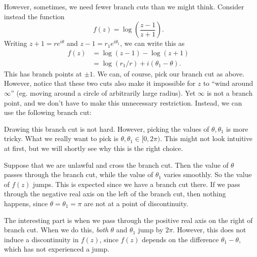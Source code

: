\documentclass[a4paper]{article}
\begin{document}
However, sometimes, we need fewer branch cuts than we might think. Consider instead the function
\[
  f(z) = \log\left(\frac{z - 1}{z + 1}\right).
\]
Writing $z + 1 = r e^{i\theta}$ and $z - 1 = r_1 e^{i \theta_1}$, we can write this as
\begin{align*}
  f(z) &= \log (z - 1) - \log(z + 1)\\
  &= \log(r_1/r) + i(\theta_1 - \theta).
\end{align*}
This has branch points at $\pm 1$. We can, of course, pick our branch cut as above. However, notice that these two cuts also make it impossible for $z$ to ``wind around $\infty$'' (eg. moving around a circle of arbitrarily large radius). Yet $\infty$ is not a branch point, and we don't have to make this unnecessary restriction. Instead, we can use the following branch cut:
\begin{center}
\end{center}
Drawing this branch cut is not hard. However, picking the values of $\theta, \theta_1$ is more tricky. What we really want to pick is $\theta, \theta_1 \in [0, 2\pi)$. This might not look intuitive at first, but we will shortly see why this is the right choice.

Suppose that we are unlawful and cross the branch cut. Then the value of $\theta$ passes through the branch cut, while the value of $\theta_1$ varies smoothly. So the value of $f(z)$ jumps. This is expected since we have a branch cut there. If we pass through the negative real axis on the left of the branch cut, then nothing happens, since $\theta = \theta_1 = \pi$ are not at a point of discontinuity.

The interesting part is when we pass through the positive real axis on the right of branch cut. When we do this, \emph{both} $\theta$ and $\theta_1$ jump by $2\pi$. However, this does not induce a discontinuity in $f(z)$, since $f(z)$ depends on the difference $\theta_1 - \theta$, which has not experienced a jump.
\end{document}
